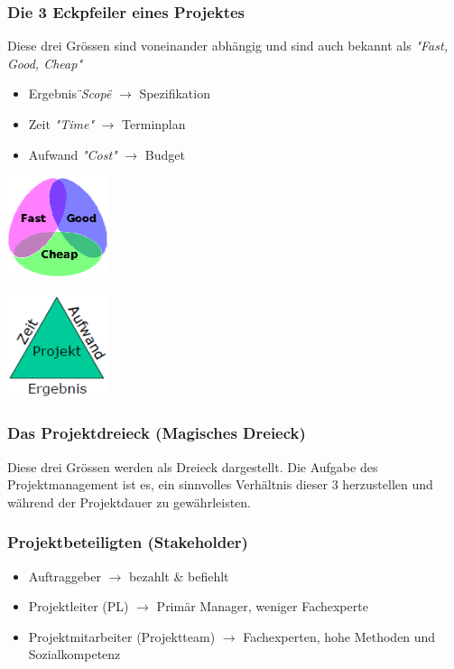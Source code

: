 \subsubsection{Die 3 Eckpfeiler eines Projektes}
\begin{minipage}{10cm}
	Diese drei Grössen sind voneinander abhängig und sind auch bekannt als \textit{"Fast, Good, Cheap"}
	\begin{itemize}
		\item Ergebnis \textit{\"{}Scope\"{}} $\rightarrow$ Spezifikation
		\item Zeit \textit{"Time"} $\rightarrow$ Terminplan
		\item Aufwand \textit{"Cost"} $\rightarrow$ Budget
	\end{itemize}
\end{minipage}
\begin{minipage}{3cm}
	\includegraphics[width=3cm]{images/eckpfeiler.png}
\end{minipage}
\begin{minipage}{3cm}
	\includegraphics[width=3cm]{images/dreieck.png}
\end{minipage}

\subsubsection{Das Projektdreieck (Magisches Dreieck)}
\begin{minipage}{15cm}
	Diese drei Grössen werden als Dreieck dargestellt. Die Aufgabe des Projektmanagement ist es, ein sinnvolles Verhältnis dieser 3 herzustellen und während der Projektdauer zu gewährleisten. 
\end{minipage}

\subsubsection{Projektbeteiligten (Stakeholder)}
\begin{itemize}
	\item Auftraggeber $\rightarrow$ bezahlt \& befiehlt
	\item Projektleiter (PL) $\rightarrow$ Primär Manager, weniger Fachexperte
	\item Projektmitarbeiter (Projektteam) $\rightarrow$ Fachexperten, hohe Methoden und Sozialkompetenz
\end{itemize}

